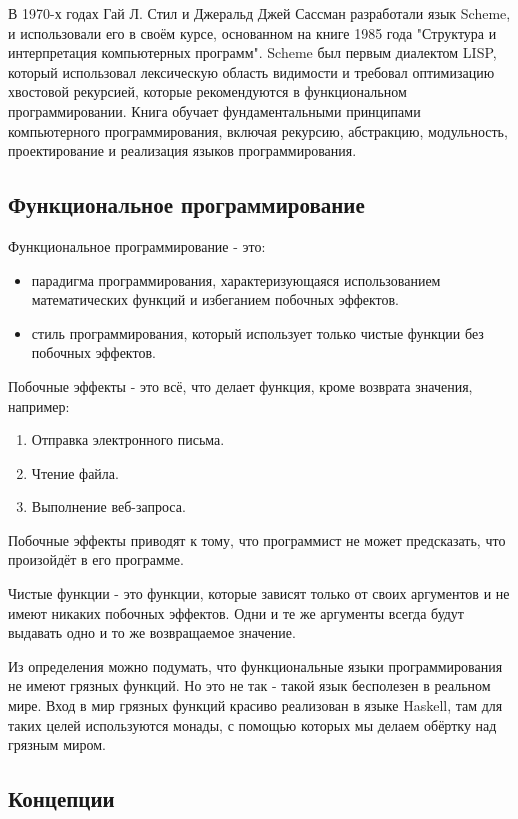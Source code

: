 В 1970-х годах Гай Л. Стил и Джеральд Джей Сассман разработали язык Scheme, и использовали его в своём курсе, основанном на книге 1985 года "Структура и интерпретация компьютерных программ"\cite{SICP}.
Scheme был первым диалектом LISP, который использовал лексическую область видимости и требовал оптимизацию хвостовой рекурсией, которые рекомендуются в функциональном программировании.
Книга обучает фундаментальными принципами компьютерного программирования, включая рекурсию, абстракцию, модульность, проектирование и реализация языков программирования.

\subsection{Функциональное программирование}

Функциональное программирование - это:

\begin{itemize}
	\item парадигма программирования, характеризующаяся использованием математических функций и избеганием побочных эффектов.
	\item стиль программирования, который использует только чистые функции без побочных эффектов.
\end{itemize}

Побочные эффекты - это всё, что делает функция, кроме возврата значения, например:

\begin{enumerate}
	\item Отправка электронного письма.
	\item Чтение файла.
	\item Выполнение веб-запроса.
\end{enumerate}

Побочные эффекты приводят к тому, что программист не может предсказать, что произойдёт в его программе.

Чистые функции - это функции, которые зависят только от своих аргументов и не имеют никаких побочных эффектов.
Одни и те же аргументы всегда будут выдавать одно и то же возвращаемое значение.

Из определения можно подумать, что функциональные языки программирования не имеют грязных функций.
Но это не так - такой язык бесполезен в реальном мире.
Вход в мир грязных функций красиво реализован в языке Haskell, там для таких целей используются монады, с помощью которых мы делаем обёртку над грязным миром.

\subsection{Концепции}

